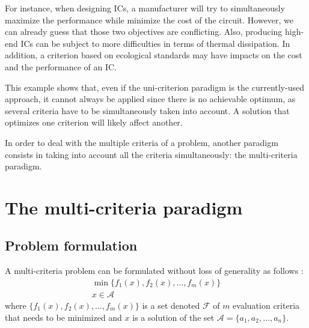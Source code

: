 For instance, when designing ICs, a manufacturer will try to simultaneously maximize the performance while minimize the cost of the circuit. However, we can already guess that those two objectives are conflicting. Also, producing high-end ICs can be subject to more difficulties in terms of thermal dissipation. In addition, a criterion based on ecological standards may have impacts on the cost and the performance of an IC.

This example shows that, even if the uni-criterion paradigm is the currently-used approach, it cannot always be applied since there is no achievable optimum, as several criteria have to be simultaneously taken into account. A solution that optimizes one criterion will likely affect another.

In order to deal with the multiple criteria of a problem, another paradigm consists in taking into account all the criteria simultaneously: the multi-criteria paradigm. %

\section{The multi-criteria paradigm}
\label{sec:rol2.multicrit_paradigm}


\subsection{Problem formulation}
A multi-criteria problem can be formulated without loss of generality as follows \cite{BraMar2002}:
\begin{equation}
\label{multicrit_formulation}
\begin{gathered}
\min \{f_1(x), f_2(x), \dots, f_m(x)\}\\
x \in \mathcal{A}
\end{gathered}
\end{equation}
where $\{f_1(x), f_2(x), \dots, f_m(x)\}$ is a set denoted $\mathcal{F}$ of $m$ evaluation criteria that needs to be minimized and $x$ is a solution of the set $\mathcal{A} = \{a_1, a_2, \dots, a_n\}$.

